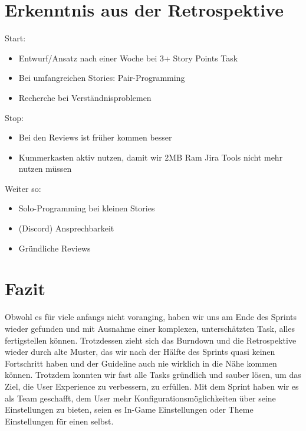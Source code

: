 \documentclass[12pt,a4paper, oneside]{article}
\begin{document}
    \section{Erkenntnis aus der Retrospektive}
    Start:
    \begin{itemize}
        \item Entwurf/Ansatz nach einer Woche bei 3+ Story Points Task
        \item Bei umfangreichen Stories: Pair-Programming
        \item Recherche bei Verständnisproblemen
    \end{itemize}
    Stop:
    \begin{itemize}
        \item Bei den Reviews ist früher kommen besser
        \item Kummerkasten aktiv nutzen, damit wir 2MB Ram Jira Tools nicht mehr nutzen müssen
    \end{itemize}
    Weiter so:
    \begin{itemize}
        \item Solo-Programming bei kleinen Stories
        \item (Discord) Ansprechbarkeit
        \item Gründliche Reviews
    \end{itemize}

    \section{Fazit}
    Obwohl es für viele anfangs nicht voranging, haben wir uns am Ende des Sprints wieder gefunden und mit Ausnahme einer komplexen, unterschätzten Task, alles fertigstellen können. Trotzdessen zieht sich das Burndown und die Retrospektive wieder durch alte Muster, das wir nach der Hälfte des Sprints quasi keinen Fortschritt haben und der Guideline auch nie wirklich in die Nähe kommen können. Trotzdem konnten wir fast alle Tasks gründlich und sauber lösen, um das Ziel, die User Experience zu verbessern, zu erfüllen. Mit dem Sprint haben wir es als Team geschafft, dem User mehr Konfigurationsmöglichkeiten über seine Einstellungen zu bieten, seien es In-Game Einstellungen oder Theme Einstellungen für einen selbst.
\end{document}

